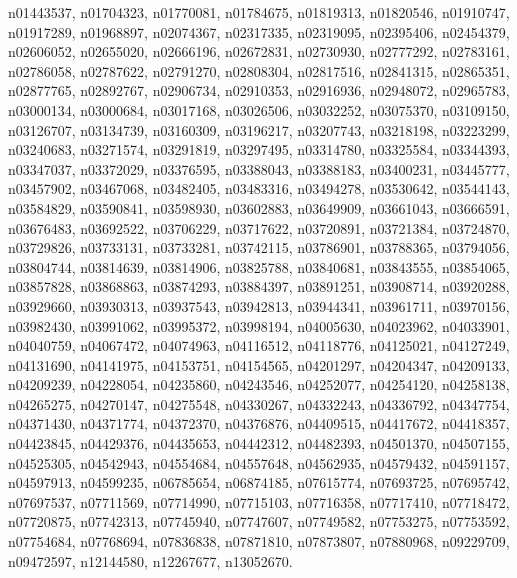 \documentclass[10pt,twocolumn,letterpaper]{article}
\begin{document}
n01443537, \quad n01704323, \quad n01770081, \quad n01784675, \quad n01819313, \quad n01820546, \quad n01910747, \quad n01917289, \quad n01968897, \quad n02074367, \quad n02317335, \quad n02319095, \quad n02395406, \quad n02454379, \quad n02606052, \quad n02655020, \quad n02666196, \quad n02672831, \quad n02730930, \quad n02777292, \quad n02783161, \quad n02786058, \quad n02787622, \quad n02791270, \quad n02808304, \quad n02817516, \quad n02841315, \quad n02865351, \quad n02877765, \quad n02892767, \quad n02906734, \quad n02910353, \quad n02916936, \quad n02948072, \quad n02965783, \quad n03000134, \quad n03000684, \quad n03017168, \quad n03026506, \quad n03032252, \quad n03075370, \quad n03109150, \quad n03126707, \quad n03134739, \quad n03160309, \quad n03196217, \quad n03207743, \quad n03218198, \quad n03223299, \quad n03240683, \quad n03271574, \quad n03291819, \quad n03297495, \quad n03314780, \quad n03325584, \quad n03344393, \quad n03347037, \quad n03372029, \quad n03376595, \quad n03388043, \quad n03388183, \quad n03400231, \quad n03445777, \quad n03457902, \quad n03467068, \quad n03482405, \quad n03483316, \quad n03494278, \quad n03530642, \quad n03544143, \quad n03584829, \quad n03590841, \quad n03598930, \quad n03602883, \quad n03649909, \quad n03661043, \quad n03666591, \quad n03676483, \quad n03692522, \quad n03706229, \quad n03717622, \quad n03720891, \quad n03721384, \quad n03724870, \quad n03729826, \quad n03733131, \quad n03733281, \quad n03742115, \quad n03786901, \quad n03788365, \quad n03794056, \quad n03804744, \quad n03814639, \quad n03814906, \quad n03825788, \quad n03840681, \quad n03843555, \quad n03854065, \quad n03857828, \quad n03868863, \quad n03874293, \quad n03884397, \quad n03891251, \quad n03908714, \quad n03920288, \quad n03929660, \quad n03930313, \quad n03937543, \quad n03942813, \quad n03944341, \quad n03961711, \quad n03970156, \quad n03982430, \quad n03991062, \quad n03995372, \quad n03998194, \quad n04005630, \quad n04023962, \quad n04033901, \quad n04040759, \quad n04067472, \quad n04074963, \quad n04116512, \quad n04118776, \quad n04125021, \quad n04127249, \quad n04131690, \quad n04141975, \quad n04153751, \quad n04154565, \quad n04201297, \quad n04204347, \quad n04209133, \quad n04209239, \quad n04228054, \quad n04235860, \quad n04243546, \quad n04252077, \quad n04254120, \quad n04258138, \quad n04265275, \quad n04270147, \quad n04275548, \quad n04330267, \quad n04332243, \quad n04336792, \quad n04347754, \quad n04371430, \quad n04371774, \quad n04372370, \quad n04376876, \quad n04409515, \quad n04417672, \quad n04418357, \quad n04423845, \quad n04429376, \quad n04435653, \quad n04442312, \quad n04482393, \quad n04501370, \quad n04507155, \quad n04525305, \quad n04542943, \quad n04554684, \quad n04557648, \quad n04562935, \quad n04579432, \quad n04591157, \quad n04597913, \quad n04599235, \quad n06785654, \quad n06874185, \quad n07615774, \quad n07693725, \quad n07695742, \quad n07697537, \quad n07711569, \quad n07714990, \quad n07715103, \quad n07716358, \quad n07717410, \quad n07718472, \quad n07720875, \quad n07742313, \quad n07745940, \quad n07747607, \quad n07749582, \quad n07753275, \quad n07753592, \quad n07754684, \quad n07768694, \quad n07836838, \quad n07871810, \quad n07873807, \quad n07880968, \quad n09229709, \quad n09472597, \quad n12144580, \quad n12267677, \quad n13052670.
 
\end{document}
